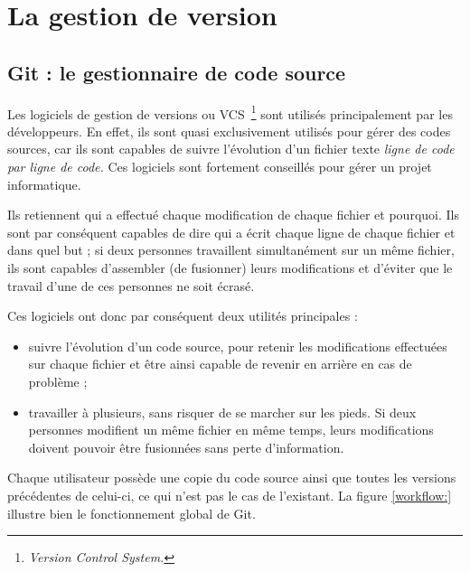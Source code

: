 \chapter{La gestion de version}

\section{Git : le gestionnaire de code source}

Les logiciels de gestion de versions ou VCS\, \footnote{\emph{Version Control
System.}} sont utilisés principalement par les développeurs. En effet, ils sont
quasi exclusivement utilisés pour gérer des codes sources, car ils sont
capables de suivre l’évolution d’un fichier texte \emph{ligne de code par ligne de
code.} Ces logiciels sont fortement conseillés pour gérer un projet
informatique.

Ils retiennent qui a effectué chaque modification de chaque fichier et
pourquoi. Ils sont par conséquent capables de dire qui a écrit chaque ligne de
chaque fichier et dans quel but ; si deux personnes travaillent simultanément
sur un même fichier, ils sont capables d’assembler (de fusionner) leurs
modifications et d’éviter que le travail d’une de ces personnes ne soit écrasé.

Ces logiciels ont donc par conséquent deux utilités principales :
\begin{itemize}
    \item suivre l’évolution d’un code source, pour retenir les modifications
effectuées sur chaque fichier et être ainsi capable de revenir en arrière en
cas de problème ;
    \item travailler à plusieurs, sans risquer de se marcher sur les pieds.
Si deux personnes modifient un même fichier en même temps, leurs modifications
doivent pouvoir être fusionnées sans perte d’information.
\end{itemize}

Chaque utilisateur possède une copie du code source ainsi que toutes les
versions précédentes de celui-ci, ce qui n'est pas le cas de l'existant. La
figure \ref{workflow:} illustre bien le fonctionnement global de Git.

